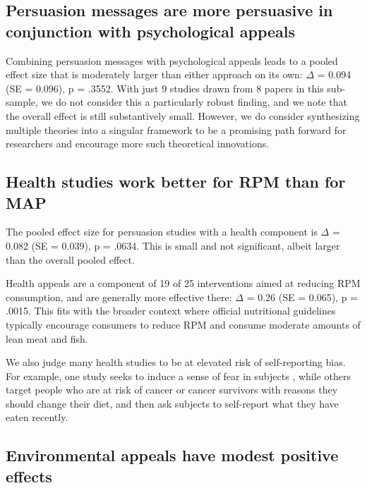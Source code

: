 \documentclass[sn-nature,referee,pdflatex]{sn-jnl}
\begin{document}
\begin{comment} maybe say something about Had our search extended to 2024, we would have likely included many more studies, many of which find small or null effects [cite]
\end{comment}

\subsection{Persuasion messages are more persuasive in conjunction with
psychological appeals}\label{sec2.6}

Combining persuasion messages with psychological appeals leads to a
pooled effect size that is moderately larger than either approach on its
own: \(\Delta\) = 0.094 (SE = 0.096), p = .3552. With just 9 studies
drawn from 8 papers in this sub-sample, we do not consider this a
particularly robust finding, and we note that the overall effect is
still substantively small. However, we do consider synthesizing multiple
theories into a singular framework to be a promising path forward for
researchers and encourage more such theoretical innovations.

\subsection{Health studies work better for RPM than for
MAP}\label{sec2.7}

The pooled effect size for persuasion studies with a health component is
\(\Delta\) = 0.082 (SE = 0.039), p = .0634. This is small and not
significant, albeit larger than the overall pooled effect.

Health appeals are a component of 19 of 25 interventions aimed at
reducing RPM consumption, and are generally more effective there:
\(\Delta\) = 0.26 (SE = 0.065), p = .0015. This fits with the broader
context where official nutritional guidelines typically encourage
consumers to reduce RPM and consume moderate amounts of lean meat and
fish.

We also judge many health studies to be at elevated risk of
self-reporting bias. For example, one study seeks to induce a sense of
fear in subjects \citep{berndsen2005}, while others target people who
are at risk of cancer \citep{hatami2018} or cancer survivors
\citep{james2015, lee2018} with reasons they should change their diet,
and then ask subjects to self-report what they have eaten recently.

\subsection{Environmental appeals have modest positive
effects}\label{sec2.8}
\end{document}
